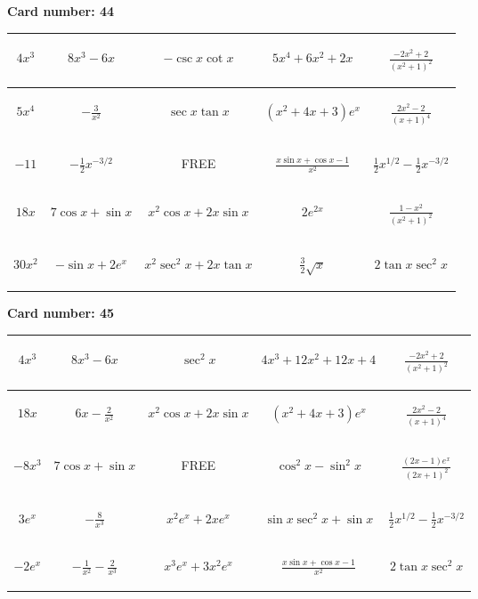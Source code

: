 \documentclass{article}
\newcommand{\entry}[1]{\begin{minipage}[t][2.75cm][t]{4cm} \vspace{1cm} \begin{center}#1\end{center} \end{minipage}}
\newcommand{\freespace}{\entry{FREE}}
\newcommand{\cardnumber}[1]{\noindent \textbf{Card number: #1} \bigskip}
\begin{document}
\pagebreak

\cardnumber{44}
\begin{center}
\begin{tabular}{|*{5}{c|}}
    \hline
    \entry{$4x^3$} & \entry{$8x^3 - 6x$} & \entry{$-\csc x \cot x$} & \entry{$5x^4 + 6x^2 + 2x$} & \entry{$\frac{-2x^2 + 2}{(x^2 + 1)^2}$} \\ \hline
    \entry{$5x^4$} & \entry{$-\frac{3}{x^2}$} & \entry{$\sec x \tan x$} & \entry{$(x^2 + 4x + 3) e^x$} & \entry{$\frac{2x^2 - 2}{(x + 1)^4}$} \\ \hline
    \entry{$-11$} & \entry{$-\frac{1}{2} x^{-3/2}$} & \freespace & \entry{$\frac{x \sin x + \cos x - 1}{x^2}$} & \entry{$\frac{1}{2} x^{1/2} - \frac{1}{2} x^{-3/2}$} \\ \hline
    \entry{$18x$} & \entry{$7 \cos x + \sin x$} & \entry{$x^2 \cos x + 2x \sin x$} & \entry{$2e^{2x}$} & \entry{$\frac{1 - x^2}{(x^2 + 1)^2}$} \\ \hline
    \entry{$30x^2$} & \entry{$-\sin x + 2e^x$} & \entry{$x^2 \sec^2 x + 2x \tan x$} & \entry{$\frac{3}{2} \sqrt{x}$} & \entry{$2 \tan x \sec^2 x$} \\ \hline
\end{tabular}
\end{center}

\pagebreak

\cardnumber{45}
\begin{center}
\begin{tabular}{|*{5}{c|}}
    \hline
    \entry{$4x^3$} & \entry{$8x^3 - 6x$} & \entry{$\sec^2 x$} & \entry{$4x^3 + 12x^2 + 12x + 4$} & \entry{$\frac{-2x^2 + 2}{(x^2 + 1)^2}$} \\ \hline
    \entry{$18x$} & \entry{$6x - \frac{2}{x^2}$} & \entry{$x^2 \cos x + 2x \sin x$} & \entry{$(x^2 + 4x + 3) e^x$} & \entry{$\frac{2x^2 - 2}{(x + 1)^4}$} \\ \hline
    \entry{$-8x^3$} & \entry{$7 \cos x + \sin x$} & \freespace & \entry{$\cos^2 x - \sin^2 x$} & \entry{$\frac{(2x - 1) e^x}{(2x + 1)^2}$} \\ \hline
    \entry{$3e^x$} & \entry{$-\frac{8}{x^3}$} & \entry{$x^2 e^x + 2x e^x$} & \entry{$\sin x \sec^2 x + \sin x$} & \entry{$\frac{1}{2} x^{1/2} - \frac{1}{2} x^{-3/2}$} \\ \hline
    \entry{$-2e^x$} & \entry{$-\frac{1}{x^2} - \frac{2}{x^3}$} & \entry{$x^3 e^x + 3x^2 e^x$} & \entry{$\frac{x \sin x + \cos x - 1}{x^2}$} & \entry{$2 \tan x \sec^2 x$} \\ \hline
\end{tabular}
\end{center}
\end{document}
